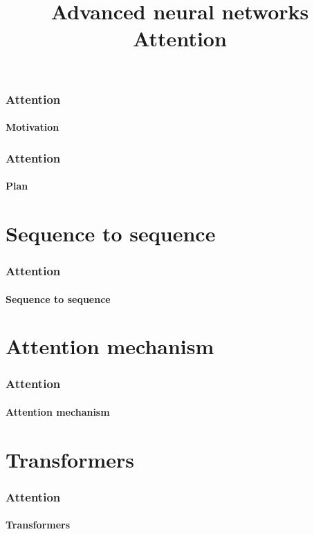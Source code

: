 \documentclass[xcolor=table]{beamer}
\title[ANN: Attention] %
{Advanced neural networks \\Attention}
\begin{document}
\begin{frame}
\frametitle{Attention}
\framesubtitle{Motivation}

\end{frame}

\begin{frame}
\frametitle{Attention}
\framesubtitle{Plan}

\begin{multicols}{2}
	\tableofcontents
\end{multicols}
\end{frame}

\section{Sequence to sequence}

\begin{frame}
	\frametitle{Attention}
	\framesubtitle{Sequence to sequence}
	
\end{frame}

\section{Attention mechanism}

\begin{frame}
	\frametitle{Attention}
	\framesubtitle{Attention mechanism}
	
\end{frame}

\section{Transformers}

\begin{frame}
	\frametitle{Attention}
	\framesubtitle{Transformers}
	
\end{frame}

\end{document}
